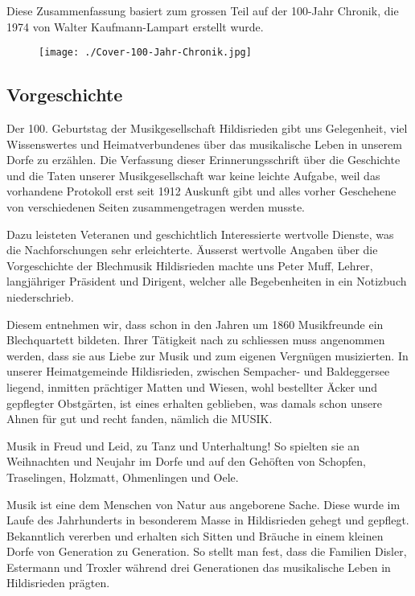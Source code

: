 Diese Zusammenfassung basiert zum grossen Teil auf der 100-Jahr Chronik, die 1974 von Walter Kaufmann-Lampart erstellt wurde.
\begin{figure}[ht]
    \texttt{[image: ./Cover-100-Jahr-Chronik.jpg]}
\end{figure}
\subsection*{Vorgeschichte}

\begin{history}

    Der 100. Geburtstag der Musikgesellschaft Hildisrieden gibt uns Gelegenheit,
    viel Wissenswertes und Heimatverbundenes über das musikalische Leben in
    unserem Dorfe zu erzählen. Die Verfassung dieser Erinnerungsschrift über die
    Geschichte und die Taten unserer Musikgesellschaft war keine leichte
    Aufgabe, weil das vorhandene Protokoll erst seit 1912 Auskunft gibt und
    alles vorher Geschehene von verschiedenen Seiten zusammengetragen werden
    musste.

    Dazu leisteten Veteranen und geschichtlich Interessierte wertvolle
    Dienste, was die Nachforschungen sehr erleichterte. Äusserst wertvolle
    Angaben über die Vorgeschichte der Blechmusik Hildisrieden machte uns Peter
    Muff, Lehrer, langjähriger Präsident und Dirigent, welcher alle
    Begebenheiten in ein Notizbuch niederschrieb.

    Diesem entnehmen wir, dass
    schon in den Jahren um 1860 Musikfreunde ein Blechquartett bildeten. Ihrer
    Tätigkeit nach zu schliessen muss angenommen werden, dass sie aus Liebe zur
    Musik und zum eigenen Vergnügen musizierten. In unserer Heimatgemeinde
    Hildisrieden, zwischen Sempacher- und Baldeggersee liegend, inmitten
    prächtiger Matten und Wiesen, wohl bestellter Äcker und gepflegter
    Obstgärten, ist eines erhalten geblieben, was damals schon unsere Ahnen für
    gut und recht fanden, nämlich die MUSIK.

    Musik in Freud und Leid, zu Tanz und Unterhaltung! So spielten sie an
    Weihnachten und Neujahr im Dorfe und auf den Gehöften von Schopfen,
    Traselingen, Holzmatt, Ohmenlingen und Oele.

    Musik ist eine dem Menschen von Natur aus angeborene Sache. Diese wurde im
    Laufe des Jahrhunderts in besonderem Masse in Hildisrieden gehegt und
    gepflegt. Bekanntlich vererben und erhalten sich Sitten und Bräuche in einem
    kleinen Dorfe von Generation zu Generation. So stellt man fest, dass die
    Familien Disler, Estermann und Troxler während drei Generationen das
    musikalische Leben in Hildisrieden prägten.

\end{history}
